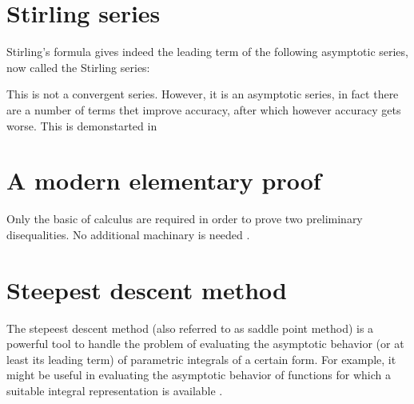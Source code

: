 \documentclass[onecolumn,a4paper,11pt]{article}
\begin{document}
\section{Stirling series}

Stirling's formula gives indeed the leading term of the following asymptotic
series, now called the Stirling series:


This is not a convergent series.
However, it is an asymptotic series, in fact there are a number of terms thet
improve accuracy, after which however accuracy gets worse. This is demonstarted
in

\section{A modern elementary proof\label{sec:Michael}}
Only 
the basic of calculus are required 
in order to prove two  preliminary  disequalities. No additional machinary is
needed%
\autocite[The original paper is][]{Michael:2002}.

\appendix


\section{Steepest descent method\label{app:saddle}}
The 
stepeest descent method (also referred to as saddle point method) is a powerful tool to handle the problem of
evaluating  the
  asymptotic behavior (or at least its leading term) of parametric integrals of a certain form.
For example, it might be useful in evaluating the asymptotic behavior of functions
 for which a suitable integral representation is available
 \autocites[An introductory discussion of these topics is given, \eg,
 by][\S~11]{King.Billingham.ea:2003}[or][\S~6.]{Ablowitz.Fokas:2003}[See
 also][\S~1]{Zinn-Justin:2002}.
\end{document}
